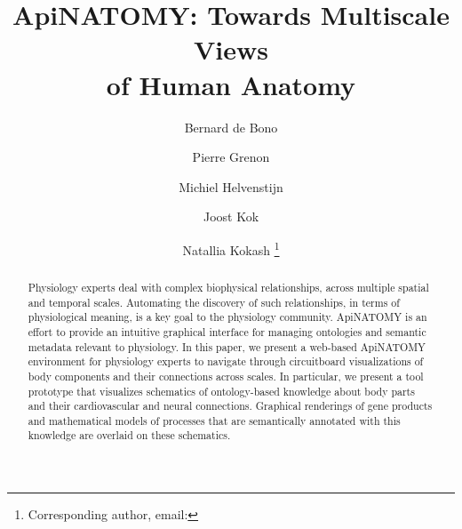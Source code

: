 \documentclass[runningheads]{llncs}                                                      %
\begin{document}

\title{ApiNATOMY: Towards Multiscale Views\\of Human Anatomy}

\author{
  Bernard de Bono
  \and
  Pierre Grenon
  \and
  Michiel Helvenstijn
  \and 	
  Joost Kok
  \and
  Natallia Kokash
  \fnmsep
  \thanks{Corresponding author, email: }
}


\maketitle

\setlength{\subfigcapskip}{0.1cm}
\setlength{\abovecaptionskip}{0cm}
\setlength{\belowcaptionskip}{0cm}
\setlength{\textfloatsep}{10pt plus 1.0pt minus 2.0pt}


\begin{abstract}
Physiology experts deal with complex biophysical relationships, across multiple spatial and temporal scales.
Automating the discovery of such relationships, in terms of physiological meaning, is a key goal to the physiology community.
ApiNATOMY is an effort to provide an intuitive graphical interface for managing ontologies and semantic metadata relevant to physiology.
In this paper, we present a web-based ApiNATOMY environment for physiology experts to navigate through circuitboard visualizations of body components and their connections across scales. In particular, we present a tool prototype that visualizes schematics of ontology-based knowledge about body parts and their cardiovascular and neural connections. Graphical renderings of gene products and mathematical models of processes that are semantically annotated with this knowledge are overlaid on these schematics.
\end{abstract}













\end{document}
